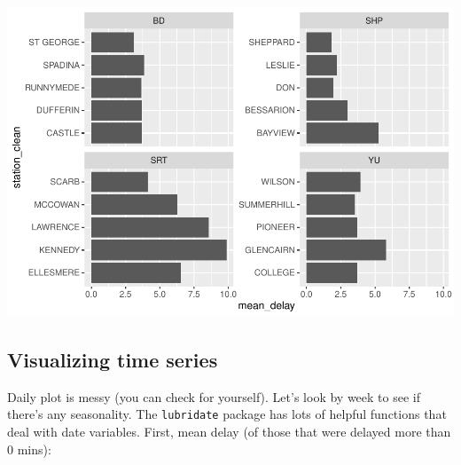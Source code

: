 \documentclass[
]{book}
\newenvironment{Shaded}{\begin{snugshade}}{\end{snugshade}}
\newcommand{\DataTypeTok}[1]{\textcolor[rgb]{0.13,0.29,0.53}{#1}}
\newcommand{\DecValTok}[1]{\textcolor[rgb]{0.00,0.00,0.81}{#1}}
\newcommand{\KeywordTok}[1]{\textcolor[rgb]{0.13,0.29,0.53}{\textbf{#1}}}
\newcommand{\NormalTok}[1]{#1}
\newcommand{\OperatorTok}[1]{\textcolor[rgb]{0.81,0.36,0.00}{\textbf{#1}}}
\newcommand{\StringTok}[1]{\textcolor[rgb]{0.31,0.60,0.02}{#1}}
\begin{document}
\includegraphics{telling_stories_with_data_files/figure-latex/unnamed-chunk-264-1.pdf}

\hypertarget{visualizing-time-series}{%
\subsection{Visualizing time series}\label{visualizing-time-series}}

Daily plot is messy (you can check for yourself). Let's look by week to see if there's any seasonality. The \texttt{lubridate} package has lots of helpful functions that deal with date variables. First, mean delay (of those that were delayed more than 0 mins):

\begin{Shaded}
\end{Shaded}
\end{document}
